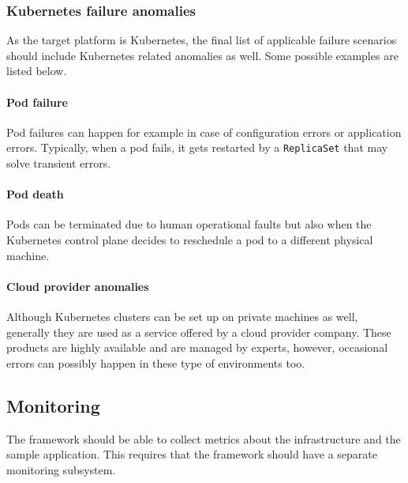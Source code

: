 \subsubsection{Kubernetes failure anomalies}

As the target platform is Kubernetes, the final list of applicable failure scenarios should include Kubernetes related anomalies as well. Some possible examples are listed below.

\paragraph{Pod failure} Pod failures can happen for example in case of configuration errors or application errors. Typically, when a pod fails, it gets restarted by a \texttt{ReplicaSet} that may solve transient errors.

\paragraph{Pod death} Pods can be terminated due to human operational faults but also when the Kubernetes control plane decides to reschedule a pod to a different physical machine.

\paragraph{Cloud provider anomalies} Although Kubernetes clusters can be set up on private machines as well, generally they are used as a service offered by a cloud provider company. These products are highly available and are managed by experts, however, occasional errors can possibly happen in these type of environments too.

\subsection{Monitoring} \label{test-design-monitoring}

The framework should be able to collect metrics about the infrastructure and the sample application. This requires that the framework should have a separate monitoring subsystem.

